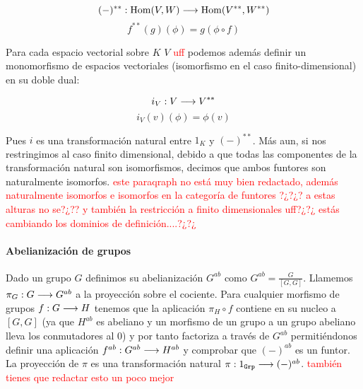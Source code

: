$$(-)^{**} : \operatorname{Hom}(V, W)\longrightarrow \operatorname{Hom}(V^{**}, W^{**})$$
$$f^{**}(g)(\phi) = g(\phi \circ f)$$

Para cada espacio vectorial sobre $K$ $V$ \textcolor{red}{uff} podemos además
definir un monomorfismo de espacios vectoriales
 (isomorfismo
en el caso finito-dimensional) en su doble dual:

\begin{equation*}
i_V : V\longrightarrow V^{**}
\end{equation*}
\begin{equation*}
i_V(v)(\phi) = \phi(v)
\end{equation*}

Pues $i$ es una transformación natural entre $1_K$ y
$(-)^{**}$. Más aun, si nos restringimos al caso finito dimensional,
debido a que todas las componentes de la transformación natural
son isomorfismos, decimos que ambos funtores son naturalmente isomorfos. \textcolor{red}{este paraqraph no está muy bien redactado, además naturalmente isomorfos e isomorfos en la categoría de funtores ?¿?¿? a estas alturas no se?¿?? y también la restricción a finito dimensionales uff?¿?¿ estás cambiando los dominios de definición....?¿?¿}

\paragraph{Abelianización de grupos}
Dado un grupo $G$ definimos su abelianización $G^{ab}$ como
$G^{ab} = \frac{G}{[G, G]}$. Llamemos $\pi_G : G\longrightarrow G^{ab}$
a la proyección sobre el cociente. Para cualquier morfismo
de grupos $f : G\longrightarrow H$ tenemos que la aplicación
$\pi_H \circ f$ contiene en su nucleo a $[G, G]$ (ya que
$H^{ab}$ es abeliano y un morfismo de un grupo a un grupo abeliano
lleva los conmutadores al 0) y por tanto factoriza a través
de $G^{ab}$ permitiéndonos definir una aplicación
$f^{ab} : G^{ab}\longrightarrow H^{ab}$ y comprobar
que $(-)^{ab}$ es un funtor. La proyección de $\pi$ es una transformación
natural $\pi : 1_{\texttt{Grp}} \longrightarrow  (-)^{ab}$. \textcolor{red}{también tienes que redactar esto un poco mejor}

